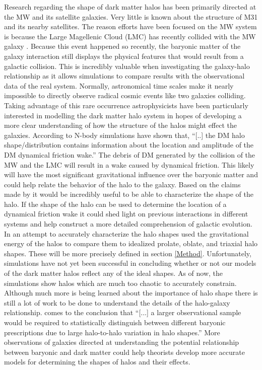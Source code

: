 \documentclass[fleqn,usenatbib]{mnras}
\begin{document}
\hspace{6mm}Research regarding the shape of dark matter halos has been primarily directed at the MW and its satellite galaxies. Very little is known about the structure of M31 and its nearby satellites. The reason efforts have been focused on the MW system is because the Large Magellenic Cloud (LMC) has recently collided with the MW galaxy \citep{Choi_2022}. Because this event happened so recently, the baryonic matter of the galaxy interaction still displays the physical features that would result from a galactic collision. This is incredibly valuable when investigating the galaxy-halo relationship as it allows simulations to compare results with the observational data of the real system. Normally, astronomical time scales make it nearly impossible to directly observe radical cosmic events like two galaxies colliding. Taking advantage of this rare occurrence astrophysicists have been particularly interested in modelling the dark matter halo system in hopes of developing a more clear understanding of how the structure of the halos might effect the galaxies. According to \cite{Garavito-Camargo_2021} N-body simulations have shown that, ``[..] the DM halo shape/distribution contains information about the location and amplitude of the DM dynamical friction wake.'' The debris of DM generated by the collision of the MW and the LMC will result in a wake caused by dynamical friction. This likely will have the most significant gravitational influence over the baryonic matter and could help relate the behavior of the halo to the galaxy. Based on the claims made by \cite{Garavito-Camargo_2021} it would be incredibly useful to be able to characterize the shape of the halo. If the shape of the halo can be used to determine the location of a dynamical friction wake it could shed light on previous interactions in different systems and help construct a more detailed comprehension of galactic evolution. In an attempt to accurately characterize the halo shapes \cite{Garavito-Camargo_2021} used the gravitational energy of the halos to compare them to idealized prolate, oblate, and triaxial halo shapes. These will be more precisely defined in section \ref{Method}. Unfortunately, simulations have not yet been successful in concluding whether or not our models of the dark matter halos reflect any of the ideal shapes. As of now, the simulations show halos which are much too chaotic to accurately constrain. Although much more is being learned about the importance of halo shape there is still a lot of work to be done to understand the details of the halo-galaxy relationship. \cite{Chua22} comes to the conclusion that ``[...] a larger observational sample would be required to statistically distinguish between different baryonic prescriptions due to large halo-to-halo variation in halo shapes.'' More observations of galaxies directed at understanding the potential relationship between baryonic and dark matter could help theorists develop more accurate models for determining the shapes of halos and their effects.
\end{document}
